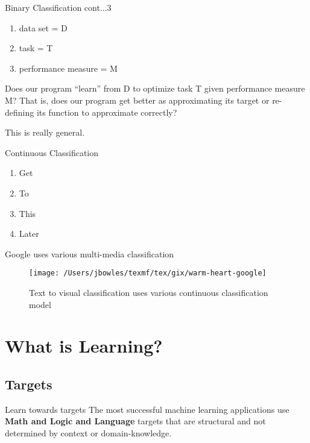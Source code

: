 \documentclass{beamer}
\begin{document}
\begin{frame}{Binary Classification cont...3}\label{bin3-classification}
\begin{enumerate}
	\item data set = D
	\item task = T
	\item performance measure = M
\end{enumerate}

Does our program ``learn'' from D to optimize task T given performance measure M? That is, does our program get better as approximating its target or re-defining its function to approximate correctly? 

This is really general.
\end{frame}

\begin{frame}{Continuous Classification}\label{cont-classification}
	
\begin{enumerate}
\item Get
\item To
\item This
\item Later
\end{enumerate}
\end{frame}

\begin{frame}{Google uses various multi-media classification}
	\begin{figure}[htpb]
		\begin{center}
			\texttt{[image: /Users/jbowles/texmf/tex/gix/warm-heart-google]}\caption{\scriptsize Text to visual classification uses various continuous classification model}
		\end{center}
	\end{figure}
\end{frame}



\section{What is Learning?}
\subsection{Targets}
\begin{frame}{Learn towards targets}
	The most successful machine learning applications use
  \textbf{Math and Logic and Language} targets that are structural and not determined by context or domain-knowledge.
 
\end{frame}
\end{document}
